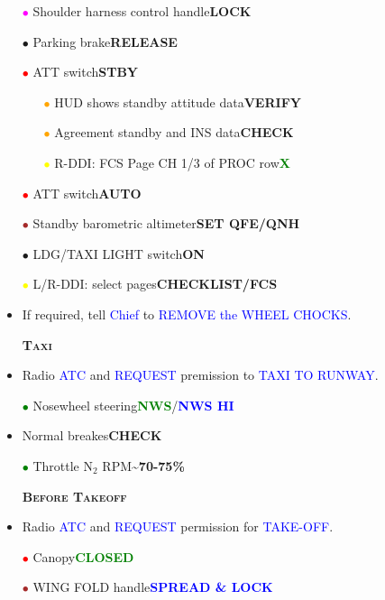 \documentclass[a4paper,12pt,dvipsnames]{letter}
\newcommand{\radio}[1]{\textcolor{blue}{#1}}
\newcommand{\button}[1]{\textbf{#1}}
\newcommand{\ok}[1]{\textcolor{Green}{\textbf{#1}}}
\newcommand{\boat}[1]{\textcolor{Blue}{\textbf{#1}}}
\newcommand{\myHead}[1]{{\LARGE\textsc{\textbf{#1}}}}
\newcommand{\bi}{\textcolor{ProcessBlue}{$\bullet$\;}}
\newcommand{\ri}{\textcolor{Red}{$\bullet$\;}}
\newcommand{\gi}{\textcolor{Green}{$\bullet$\;}}
\newcommand{\yi}{\textcolor{Yellow}{$\bullet$\;}}
\newcommand{\mi}{\textcolor{Magenta}{$\bullet$\;}}
\newcommand{\oi}{\textcolor{Orange}{$\bullet$\;}}
\renewcommand{\ni}{\textcolor{Brown}{$\bullet$\;}}
\begin{document}
{\begin{itemize}
 \item[\mi] Shoulder harness control handle\dotfill\button{LOCK}
 \item[\bi] Parking brake\dotfill\button{RELEASE}
 \item[\ri] ATT switch\dotfill\button{STBY}
 \begin{itemize}
  \item[\oi] HUD shows standby attitude data\dotfill\button{VERIFY}
  \item[\oi] Agreement standby and INS data\dotfill\button{CHECK}
  \item[\yi] R-DDI: FCS Page CH 1/3 of PROC row\dotfill\ok{X}
 \end{itemize}
 \item[\ri] ATT switch\dotfill\button{AUTO}
 \item[\ni] Standby barometric altimeter\dotfill\button{SET QFE/QNH}
 \item[\bi] LDG/TAXI LIGHT switch\dotfill\button{ON}
 \item[\yi] L/R-DDI: select pages\dotfill\button{CHECKLIST/FCS}
 \item If required, tell \radio{Chief} to \radio{REMOVE the WHEEL CHOCKS}.
\end{itemize}
\newpage
\begin{itemize}
 \item[] \myHead{Taxi}
 \item Radio \radio{ATC} and \radio{REQUEST} premission to \radio{TAXI TO RUNWAY}.
 \item[\gi] Nosewheel steering\dotfill\ok{NWS}/\boat{NWS HI}
 \item Normal breakes\dotfill\button{CHECK}
 \item[\gi] Throttle N$_2$ RPM\dotfill\button{\textasciitilde70-75\%}
\end{itemize}
\vspace{0.5em}
\begin{itemize}
 \item[] \myHead{Before Takeoff}
 \item Radio \radio{ATC} and \radio{REQUEST} permission for \radio{TAKE-OFF}.
 \item[\ri] Canopy\dotfill\ok{CLOSED}
 \item[\ni] WING FOLD handle\dotfill\boat{SPREAD \& LOCK}

\end{itemize}}
\end{document}
